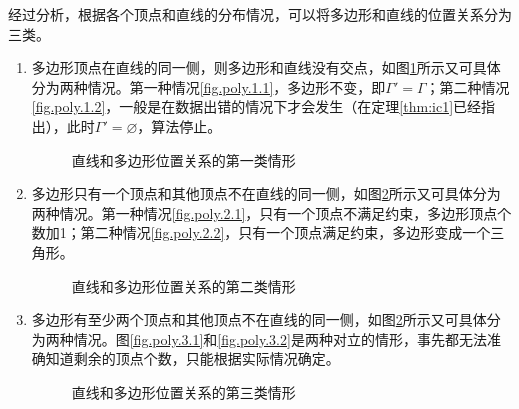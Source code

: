 经过分析，根据各个顶点和直线的分布情况，可以将多边形和直线的位置关系分为三类。
\begin{enumerate}
\item 多边形顶点在直线的同一侧，则多边形和直线没有交点，如图\ref{fig.3.beta.l.1}所示又可具体分为两种情况。第一种情况\ref{fig.poly.1.1}，多边形不变，即$\Gamma'=\Gamma$；第二种情况\ref{fig.poly.1.2}，一般是在数据出错的情况下才会发生（在定理\eqref{thm:ic1}已经指出），此时$\Gamma'=\varnothing$，算法停止。
\begin{figure}[htp]
	\centering
	\caption{直线和多边形位置关系的第一类情形}	 %
	\label{fig.3.beta.l.1}	 %
\end{figure}
\item 多边形只有一个顶点和其他顶点不在直线的同一侧，如图\ref{fig.3.beta.l.2}所示又可具体分为两种情况。第一种情况\ref{fig.poly.2.1}，只有一个顶点不满足约束，多边形顶点个数加1；第二种情况\ref{fig.poly.2.2}，只有一个顶点满足约束，多边形变成一个三角形。
\begin{figure}[htp]
	\centering
	\caption{直线和多边形位置关系的第二类情形}	 %
	\label{fig.3.beta.l.2}	 %
\end{figure}
\item 多边形有至少两个顶点和其他顶点不在直线的同一侧，如图\ref{fig.3.beta.l.2}所示又可具体分为两种情况。图\ref{fig.poly.3.1}和\ref{fig.poly.3.2}是两种对立的情形，事先都无法准确知道剩余的顶点个数，只能根据实际情况确定。
\begin{figure}[htp]
	\centering
	\caption{直线和多边形位置关系的第三类情形}	 %
	\label{fig.3.beta.l.3}	 %
\end{figure}
\end{enumerate}

